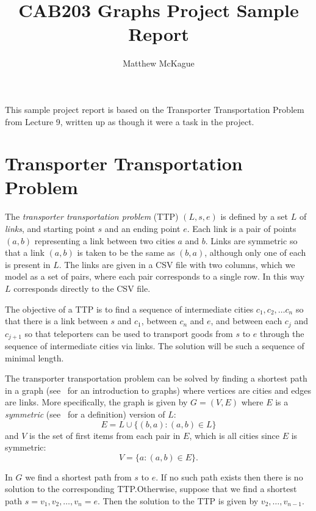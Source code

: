 \documentclass[a4paper]{article}
\author{Matthew McKague}
\title{CAB203 Graphs Project Sample Report}
\date{}
\begin{document}
\maketitle

This sample project report is based on the Transporter Transportation Problem from Lecture 9, written up as though it were a task in the project.

\section{Transporter Transportation Problem}

The \emph{transporter transportation problem} (TTP) $(L, s, e)$ is defined by a set $L$ of \emph{links}, and starting point $s$ and an ending point $e$.  Each link is a pair of points $(a,b)$ representing a link between two cities $a$ and $b$.  Links are symmetric so that a link $(a,b)$ is taken to be the same as $(b, a)$, although only one of each is present in $L$.  The links are given in a CSV file with two columns, which we model as a set of pairs, where each pair corresponds to a single row.  In this way $L$ corresponds directly to the CSV file.

The objective of a TTP is to find a sequence of intermediate cities $c_1, c_2, \ldots c_n$ so that there is a link between $s$ and $c_1$, between $c_n$ and $e$, and between each $c_j$ and $c_{j+1}$ so that teleporters can be used to transport goods from $s$ to $e$ through the sequence of intermediate cities via links.  The solution will be such a sequence of minimal length.

The transporter transportation problem can be solved by finding a shortest path in a graph (see~\cite{voloshintextbook} for an introduction to graphs) where vertices are cities and edges are links.  More specifically, the graph is given by $G = (V, E)$ where $E$ is a \emph{symmetric} (see~\cite{cab203lecture6} for a definition) version of $L$:
\begin{equation}\label{eq:E}
    E = L \cup \{ (b, a) : (a,b) \in L \}
\end{equation}
and $V$ is the set of first items from each pair in $E$, which is all cities since $E$ is symmetric:
\begin{equation}\label{eq:V}
    V = \{ a : (a,b) \in E\}.
\end{equation}

In $G$ we find a shortest path from $s$ to $e$.  If no such path exists then there is no solution to the corresponding TTP.\@  Otherwise, suppose that we find a shortest path $s = v_1, v_2, \ldots , v_n= e$.  Then the solution to the TTP is given by $v_2, \ldots, v_{n-1}$.
\end{document}
